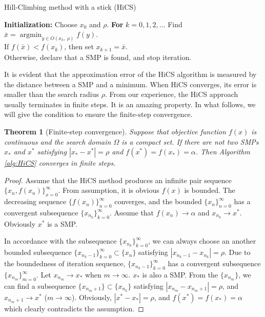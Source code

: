 \documentclass[final,1p,times]{elsarticle}
\newtheorem{theorem}{Theorem}
\DeclareMathOperator*{\argmin}{\mathrm{argmin}}
\begin{document}
\begin{algorithm}[H]
	\caption{Hill-Climbing method with a stick (HiCS)}
	\label{alg:HiCS}
\begin{algorithmic}[1]
	\STATE \textbf{Initialization:} Choose $x_0$ and $\rho$.
	\STATE \textbf{For} $k=0,1,2,\dots$
	\STATE \hspace{0.5cm} 
	Find $\bar{x}=\argmin_{y\in O(x_k,~ \rho)} f(y)$.
			\\
	\hspace{0.5cm} If $f(\bar x)<f(x_k)$, then set $x_{k+1}= \bar{x}$.
		  \\
		   \hspace{0.5cm} Otherwise, declare that 
		   a SMP is found, and stop iteration.
\end{algorithmic}
\end{algorithm}
It is evident that the approximation error of the HiCS algorithm
is measured by the distance between a SMP and a minimum.
When HiCS converges, its error is smaller than the search radius
$\rho$.
From our experience, the HiCS approach usually terminates in 
finite steps. It is an amazing property. In what follows, we will
give the condition to ensure the finite-step convergence.

\begin{theorem}[Finite-step convergence]
	\label{thm:fsc}
	Suppose that objective function $f(x)$ is continuous and the
	search domain $\Omega$ is a compact set.
	If there are not two SMPs $x_*$ and $x^*$ satisfying 
	$|x_*-x^*|=\rho$ and $f(x^*)=f(x_*)=\alpha$.
	Then Algorithm \ref{alg:HiCS} converges in finite steps.
\end{theorem}
\begin{proof}
	Assume that the HiCS method produces an infinite pair sequence
	$\{x_n, f(x_n)\}_{x=0}^{\infty}$. From assumption,
	it is obvious $f(x)$ is bounded. The decreasing sequence
	$\{f(x_n)\}_{n=0}^\infty$ converges, and the bounded
	$\{x_n\}_{n=0}^\infty$ has a convergent subsequence 
	$\{x_{n_k}\}_{k=0}^\infty$. Assume that $f(x_n)\rightarrow
	\alpha$ and $x_{n_k}\rightarrow x^*$. Obviously $x^*$ is a SMP.
	
	In accordance with the subsequence
	$\{x_{n_k}\}_{k=0}^\infty$, we can always choose an another
	bounded subsequence $\{x_{n_k -1}\}_{k=0}^\infty \subset
	\{x_n\}$ satisfying $|x_{n_k - 1}-x_{n_k}|=\rho$. 
	Due to the boundedness of iteration
	sequence, $\{x_{n_k-1}\}_{k=0}^\infty$ has a convergent
	subsequence $\{x_{n_{m}}\}_{m=0}^\infty$. Let $x_{n_m}
	\rightarrow x_*$ when $m\rightarrow \infty$. $x_*$ is also a SMP.
	From the $\{x_{n_m}\}$, we can find a subsequence
	$\{x_{n_{m}+1}\}\subset \{x_{n_k}\}$ satisfying
	$|x_{n_m}-x_{n_{m}+1}|=\rho$, and $x_{n_{m}+1}\rightarrow x^*$
	($m\rightarrow \infty$).
	Obviously, $|x^*-x_*|=\rho$, and $f(x^*)=f(x_*)=\alpha$ 
	which clearly contradicts the assumption.
\end{proof}
\end{document}
